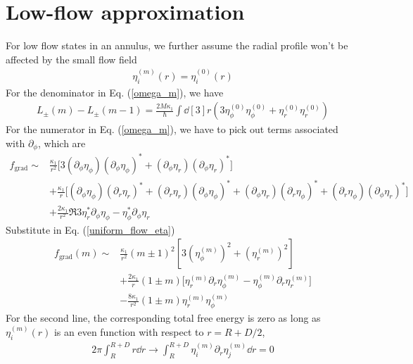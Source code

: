 \documentclass[aps,prl,preprint]{revtex4-2}
\begin{document}
\section{Low-flow approximation}
For low flow states in an annulus, we further assume the radial profile won't be affected by the small flow field
\begin{align}
    \eta^{(m)}_i(r) = \eta^{(0)}_i(r)
\end{align}
For the denominator in Eq. (\ref{omega_m}), we have
\begin{align}
    L_\pm(m) - L_\pm(m-1) = \frac{2M\kappa_1}{\hbar}\int\dd[3]r\left(3\eta_\phi^{(0)}\eta_\phi^{(0)}+\eta_r^{(0)}\eta_r^{(0)}\right)
\end{align}
For the numerator in Eq. (\ref{omega_m}), we have to pick out terms associated with $\partial_\phi$, which are
\begin{align}
    f_\text{grad}\sim & \frac{\kappa_1}{r^2}\bigg[3(\partial_\phi\eta_\phi)(\partial_\phi\eta_\phi)^*
    + (\partial_\phi\eta_r)(\partial_\phi\eta_r)^*\bigg]\nonumber                                     \\
                      & +\frac{\kappa_1}{r}\bigg[(\partial_\phi\eta_\phi)(\partial_r\eta_r)^*
        + (\partial_r\eta_r)(\partial_\phi\eta_\phi)^* + (\partial_\phi\eta_r)(\partial_r\eta_\phi)^*
    + (\partial_r\eta_\phi)(\partial_\phi\eta_r)^*\bigg]\nonumber                                     \\
                      & +\frac{2\kappa_1}{r^2}\Re{3\eta_r^*\partial_\phi\eta_\phi
        - \eta_\phi^*\partial_\phi\eta_r}
\end{align}
Substitute in Eq. (\ref{uniform_flow_eta})
\begin{align}
    f_\text{grad}(m)\sim & \frac{\kappa_1}{r^2}(m\pm 1)^2\left[3\left(\eta^{(m)}_\phi\right)^2 + \left(\eta^{(m)}_r\right)^2\right]\nonumber              \\
                         & +\frac{2\kappa_1}{r}(1\pm m)\bigg[\eta_r^{(m)}\partial_r\eta_\phi^{(m)} - \eta_\phi^{(m)}\partial_r\eta_r^{(m)}\bigg]\nonumber \\
                         & -\frac{8\kappa_1}{r^2}(1\pm m)\eta^{(m)}_r\eta^{(m)}_\phi
\end{align}
For the second line, the corresponding total free energy is zero as long as $\eta_i^{(m)}(r)$ is an even function with respect to $r=R+D/2$,
\begin{align}
    2\pi\int_R^{R+D} r\dd r\rightarrow\int_R^{R+D}\eta^{(m)}_i\partial_r\eta^{(m)}_j\dd r = 0
\end{align}
\end{document}
